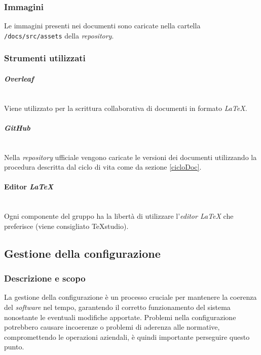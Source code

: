 \documentclass[5pt]{article}
\begin{document}
\subsubsection{Immagini}
Le immagini presenti nei documenti sono caricate nella cartella \texttt{/docs/src/assets} della \textit{repository}.

\subsubsection{Strumenti utilizzati}
\paragraph{\textit{Overleaf}}~\\
Viene utilizzato per la scrittura collaborativa di documenti in formato \textit{LaTeX}.
\paragraph{\textit{GitHub}}~\\
Nella \textit{repository} ufficiale vengono caricate le versioni dei documenti utilizzando la procedura descritta dal ciclo di vita come da sezione \ref{cicloDoc}.
\paragraph{Editor \textit{LaTeX}}~\\
Ogni componente del gruppo ha la libertà di utilizzare l'\textit{editor LaTeX} che preferisce (viene consigliato TeXstudio).

\subsection{Gestione della configurazione}
    \subsubsection{Descrizione e scopo}
    La gestione della configurazione è un processo cruciale per mantenere la coerenza del \textit{software} nel tempo, garantendo il corretto funzionamento del sistema nonostante le eventuali modifiche apportate. Problemi nella configurazione potrebbero causare incoerenze o problemi di aderenza alle normative, compromettendo le operazioni aziendali, è quindi importante perseguire questo punto.
    
\end{document}
